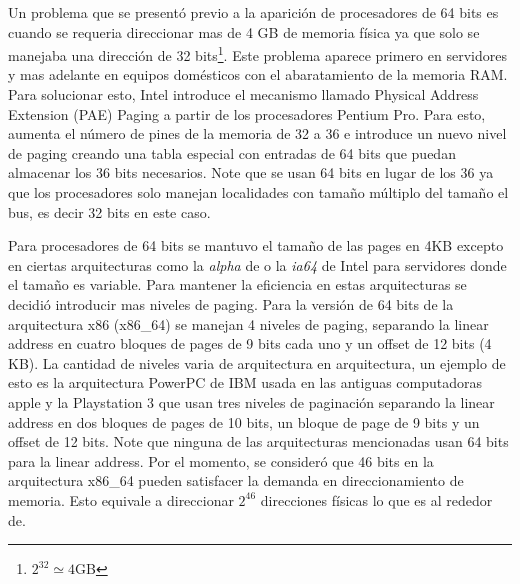 Un problema que se presentó previo a la aparición de procesadores de 64 bits es
cuando se requeria direccionar mas de 4 GB de memoria física ya que solo se
manejaba una dirección de 32 bits\footnote{$2^32\simeq4$GB}. Este problema
aparece primero en servidores y mas adelante en equipos domésticos con el
abaratamiento de la memoria RAM. Para solucionar esto, Intel introduce el
mecanismo llamado Physical Address Extension (PAE) Paging a partir de los
procesadores Pentium Pro. Para esto, aumenta el número de pines de la memoria
de 32 a 36 e introduce un nuevo nivel de paging creando una tabla especial con
entradas de 64 bits que puedan almacenar los 36 bits necesarios. Note que se
usan 64 bits en lugar de los 36 ya que los procesadores solo manejan
localidades con tamaño múltiplo del tamaño el bus, es decir 32 bits en este
caso.

Para procesadores de 64 bits se mantuvo el tamaño de las pages en 4KB excepto
en ciertas arquitecturas como la \emph{alpha} de o la \emph{ia64} de Intel para
servidores donde el tamaño es variable. Para mantener la eficiencia en estas
arquitecturas se decidió introducir mas niveles de paging. Para la versión de
64 bits de la arquitectura x86 (x86_64) se manejan 4 niveles de paging,
separando la linear address en cuatro bloques de pages de 9 bits cada uno y un
offset de 12 bits (4 KB). La cantidad de niveles varia de arquitectura en
arquitectura, un ejemplo de esto es la arquitectura PowerPC de IBM usada en las
antiguas computadoras apple y la Playstation 3 que usan tres niveles de
paginación separando la linear address en dos bloques de pages de 10 bits, un
bloque de page de 9 bits y un offset de 12 bits. Note que ninguna de las
arquitecturas mencionadas usan 64 bits para la linear address. Por el momento,
se consideró que 46 bits en la arquitectura x86_64 pueden satisfacer la demanda
en direccionamiento de memoria. Esto equivale a direccionar $2^46$ direcciones
físicas lo que es al rededor de.

